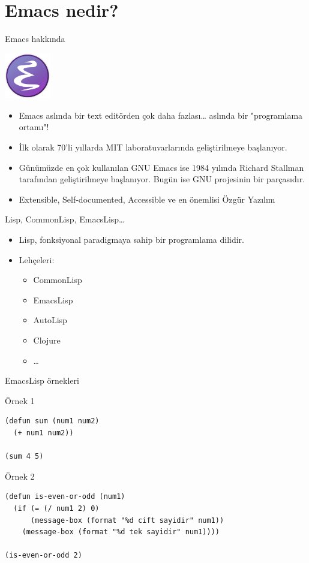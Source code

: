 \documentclass[presentation,smaller]{beamer}
\begin{document}
\section{Emacs nedir?}
\label{sec:org1a53788}
\begin{frame}[label={sec:org6a0efdb}]{Emacs hakkında}
\begin{center}
\includegraphics[height=2cm]{./_images/emacs_logo.png}
\end{center}

\begin{itemize}
\item Emacs aslında bir text editörden çok daha fazlası\ldots{} aslında bir "programlama ortamı"!
\item İlk olarak 70'li yıllarda MIT laboratuvarlarında geliştirilmeye başlanıyor.
\item Günümüzde en çok kullanılan GNU Emacs ise 1984 yılında Richard Stallman
tarafından geliştirilmeye başlanıyor. Bugün ise GNU projesinin bir parçasıdır.
\item Extensible, Self-documented, Accessible ve en önemlisi Özgür Yazılım
\end{itemize}
\end{frame}
\begin{frame}[label={sec:orgf1c8518}]{Lisp, CommonLisp, EmacsLisp\ldots{}}
\begin{itemize}
\item Lisp, fonksiyonal paradigmaya sahip bir programlama dilidir.
\item Lehçeleri:
\begin{itemize}
\item CommonLisp
\item EmacsLisp
\item AutoLisp
\item Clojure
\item \ldots{}
\end{itemize}
\end{itemize}
\end{frame}
\begin{frame}[label={sec:org4e1a281},fragile]{EmacsLisp örnekleri}
 \begin{block}{Örnek 1}
\begin{verbatim}
(defun sum (num1 num2)
  (+ num1 num2))

(sum 4 5)
\end{verbatim}
\end{block}

\begin{block}{Örnek 2}
\begin{verbatim}
(defun is-even-or-odd (num1)
  (if (= (/ num1 2) 0)
      (message-box (format "%d cift sayidir" num1))
    (message-box (format "%d tek sayidir" num1))))

(is-even-or-odd 2)
\end{verbatim}
\end{block}
\end{frame}
\end{document}
